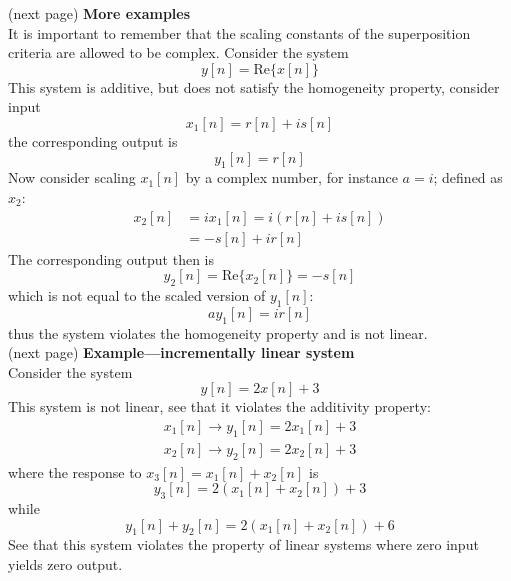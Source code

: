 \documentclass{report}
\begin{document}
(next page)\newpage
\noindent\textbf{More examples}\\
It is important to remember that the scaling constants of the superposition criteria are allowed to be complex. Consider
the system
\begin{equation*}
y[n]=\text{Re}\{x[n]\}
\end{equation*}
This system is additive, but does not satisfy the homogeneity property, consider input
\begin{equation*}
x_1[n]=r[n]+is[n]
\end{equation*}
the corresponding output is 
\begin{equation*}
y_1[n]=r[n]
\end{equation*}
Now consider scaling $x_1[n]$ by a complex number, for instance $a=i$; defined as $x_2$:
\begin{align*}
x_2[n]&=ix_1[n]=i(r[n]+is[n])\\
&=-s[n]+ir[n]
\end{align*}
The corresponding output then is
\begin{equation*}
y_2[n]=\text{Re}\{x_2[n]\}=-s[n]
\end{equation*}
which is not equal to the scaled version of $y_1[n]$:
\begin{equation*}
ay_1[n]=ir[n]
\end{equation*}
thus the system violates the homogeneity property and is not linear.\\
(next page)\newpage
\noindent\textbf{Example---incrementally linear system}\\
Consider the system
\begin{equation*}
y[n]=2x[n]+3
\end{equation*}
This system is not linear, see that it violates the additivity property:
\begin{align*}
x_1[n]\to y_1[n]=2x_1[n]+3\\
x_2[n]\to y_2[n]=2x_2[n]+3
\end{align*}
where the response to $x_3[n]=x_1[n]+x_2[n]$ is
\begin{equation*}
y_3[n]=2(x_1[n]+x_2[n])+3
\end{equation*}
while 
\begin{equation*}
y_1[n]+y_2[n]=2(x_1[n]+x_2[n])+6
\end{equation*}
See that this system violates the property of linear systems where zero input yields zero output.\\
\vspace{1mm}\\
\end{document}

